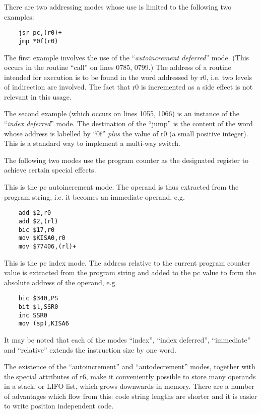 There are two addressing modes whose
use is limited to the following two
examples:

\begin{verbatim}
    jsr pc,(r0)+
    jmp *0f(r0)
\end{verbatim}

The first example involves the use of
the ``{\it autoincrement deferred}'' mode.
(This occurs in the routine ``call'' on
lines 0785, 0799.) The address of a
routine intended for execution is to be
found in the word addressed by r0, i.e.
two levels of indirection are involved.
The fact that r0 is incremented as a
side effect is not relevant in this
usage.

The second example (which occurs on
lines 1055, 1066) is an instance of the
``{\it index deferred}'' mode. The destination
of the ``jump'' is the content of the
word whose address is labelled by ``0f''
{\it plus} the value of r0 (a small positive
integer). This is a standard way to
implement a multi-way switch.


The following two modes use the program
counter as the designated register to
achieve certain special effects.

\item[Immediate Mode:] This is the pc autoincrement
mode. The operand is thus
extracted from the program string, i.e.
it becomes an immediate operand, e.g.

\begin{verbatim}
    add $2,r0
    add $2,(rl)
    bic $17,r0
    mov $KISA0,r0
    mov $77406,(rl)+
\end{verbatim}

\item[Relative Mode:] This is the pc index
mode. The address relative to the
current program counter value is
extracted from the program string and
added to the pc value to form the absolute
address of the operand, e.g.

\begin{verbatim}
    bic $340,PS
    bit $l,SSR0
    inc SSR0
    mov (sp),KISA6
\end{verbatim}
\ed

It may be noted that each of the modes
``index'', ``index deferred'', ``immediate''
and ``relative'' extends the instruction
size by one word.

The existence of the ``autoincrement''
and ``autodecrement'' modes, together
with the special attributes of r6, make
it conveniently possible to store many
operands in a stack, or LIFO list,
which grows downwards in memory. There
are a number of advantages which flow
from this: code string lengths are
shorter and it is easier to write
position independent code.

